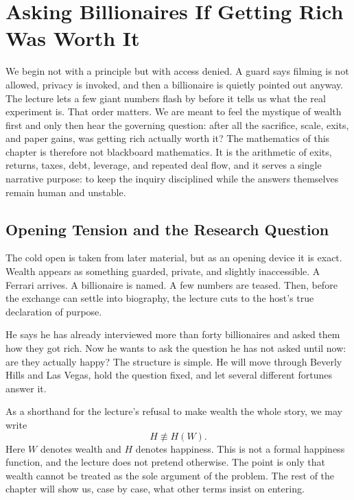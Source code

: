 \chapter{Asking Billionaires If Getting Rich Was Worth It}

We begin not with a principle but with access denied. A guard says filming is not allowed, privacy is invoked, and then a billionaire is quietly pointed out anyway. The lecture lets a few giant numbers flash by before it tells us what the real experiment is. That order matters. We are meant to feel the mystique of wealth first and only then hear the governing question: after all the sacrifice, scale, exits, and paper gains, was getting rich actually worth it? The mathematics of this chapter is therefore not blackboard mathematics. It is the arithmetic of exits, returns, taxes, debt, leverage, and repeated deal flow, and it serves a single narrative purpose: to keep the inquiry disciplined while the answers themselves remain human and unstable.

\section{Opening Tension and the Research Question}

The cold open is taken from later material, but as an opening device it is exact. Wealth appears as something guarded, private, and slightly inaccessible. A Ferrari arrives. A billionaire is named. A few numbers are teased. Then, before the exchange can settle into biography, the lecture cuts to the host's true declaration of purpose.

He says he has already interviewed more than forty billionaires and asked them how they got rich. Now he wants to ask the question he has not asked until now: are they actually happy? The structure is simple. He will move through Beverly Hills and Las Vegas, hold the question fixed, and let several different fortunes answer it.

As a shorthand for the lecture's refusal to make wealth the whole story, we may write
\begin{equation}
H \not\equiv H(W).
\end{equation}
Here \(W\) denotes wealth and \(H\) denotes happiness. This is not a formal happiness function, and the lecture does not pretend otherwise. The point is only that wealth cannot be treated as the sole argument of the problem. The rest of the chapter will show us, case by case, what other terms insist on entering.

